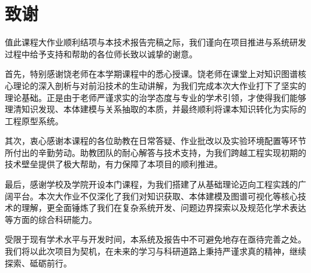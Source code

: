 \section{致谢}
值此课程大作业顺利结项与本技术报告完稿之际，我们谨向在项目推进与系统研发过程中给予支持和帮助的各位师长致以诚挚的谢意。

首先，特别感谢饶老师在本学期课程中的悉心授课。饶老师在课堂上对知识图谱核心理论的深入剖析与对前沿技术的生动讲解，为我们完成本次大作业打下了坚实的理论基础。正是由于老师严谨求实的治学态度与专业的学术引领，才使得我们能够理清知识发现、本体建模与关系抽取的本质，并最终顺利将课本知识转化为实际的工程原型系统。

其次，衷心感谢本课程的各位助教在日常答疑、作业批改以及实验环境配置等环节所付出的辛勤劳动。助教团队的耐心解答与技术支持，为我们跨越工程实现初期的技术壁垒提供了极大帮助，有力保障了本项目的顺利推进。

最后，感谢学校及学院开设本门课程，为我们搭建了从基础理论迈向工程实践的广阔平台。本次大作业不仅深化了我们对知识获取、本体建模及图谱可视化等核心技术的理解，更全面锤炼了我们在复杂系统开发、问题边界探索以及规范化学术表达等方面的综合科研能力。

受限于现有学术水平与开发时间，本系统及报告中不可避免地存在亟待完善之处。我们将以此次项目为契机，在未来的学习与科研道路上秉持严谨求真的精神，继续探索、砥砺前行。
